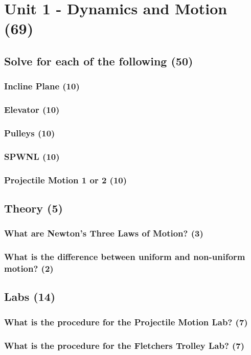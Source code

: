 \documentclass{article}
\begin{document}
\section{Unit 1 - Dynamics and Motion (69)}
\subsection{Solve for each of the following (50)}
\subsubsection{Incline Plane (10)}
\subsubsection{Elevator (10)}
\subsubsection{Pulleys (10)}
\subsubsection{SPWNL (10)}
\subsubsection{Projectile Motion 1 or 2 (10)}

\subsection{Theory (5)}
\subsubsection{What are Newton's Three Laws of Motion? (3)}
\subsubsection{What is the difference between uniform and non-uniform motion? (2)}

\subsection{Labs (14)}
\subsubsection{What is the procedure for the Projectile Motion Lab? (7)}
\subsubsection{What is the procedure for the Fletchers Trolley Lab? (7)}
\end{document}
